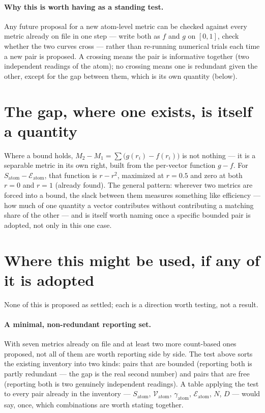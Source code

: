 \documentclass[11pt]{article}
\begin{document}
\paragraph{Why this is worth having as a standing test.} Any future
proposal for a new atom-level metric can be checked against every
metric already on file in one step --- write both as $f$ and $g$ on
$[0,1]$, check whether the two curves cross --- rather than
re-running numerical trials each time a new pair is proposed. A
crossing means the pair is informative together (two independent
readings of the atom); no crossing means one is redundant given the
other, except for the gap between them, which is its own quantity
(below).

\section{The gap, where one exists, is itself a quantity}

Where a bound holds, $M_2-M_1=\sum\bigl(g(r_i)-f(r_i)\bigr)$ is not
nothing --- it is a separable metric in its own right, built from the
per-vector function $g-f$. For $S_{\text{atom}}-\mathcal{E}_{\text{atom}}$,
that function is $r-r^2$, maximized at $r=0.5$ and zero at both
$r=0$ and $r=1$ (already found). The general pattern: wherever two
metrics are forced into a bound, the slack between them measures
something like efficiency --- how much of one quantity a vector
contributes without contributing a matching share of the other ---
and is itself worth naming once a specific bounded pair is adopted,
not only in this one case.

\section{Where this might be used, if any of it is adopted}

None of this is proposed as settled; each is a direction worth
testing, not a result.

\paragraph{A minimal, non-redundant reporting set.} With seven
metrics already on file and at least two more count-based ones
proposed, not all of them are worth reporting side by side. The test
above sorts the existing inventory into two kinds: pairs that are
bounded (reporting both is partly redundant --- the gap is the real
second number) and pairs that are free (reporting both is two
genuinely independent readings). A table applying the test to every
pair already in the inventory --- $S_{\text{atom}}$,
$\mathcal{V}_{\text{atom}}$, $\gamma_{\text{atom}}$,
$\mathcal{E}_{\text{atom}}$, $N$, $D$ --- would say, once, which
combinations are worth stating together.
\end{document}
